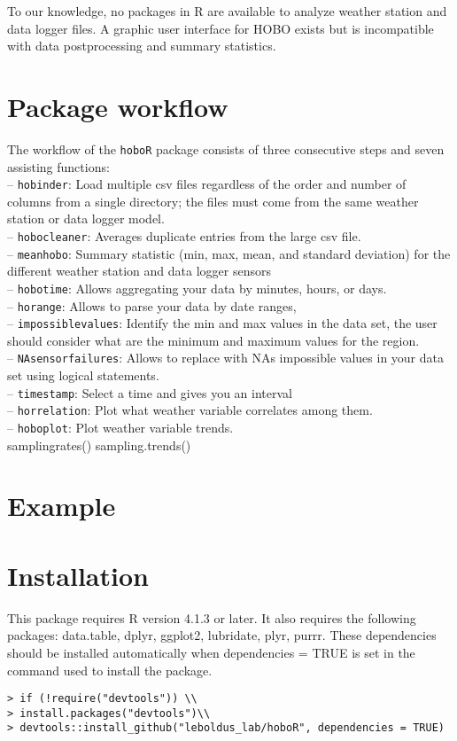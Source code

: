 \documentclass[11pt, oneside]{article}   	%
\begin{document}
To our knowledge, no packages in R are available to analyze weather station and data logger files. A graphic user interface for HOBO exists but is incompatible with data postprocessing and summary statistics. 

\section*{Package workflow}
The workflow of the \verb|hoboR| package consists of three consecutive steps and seven assisting functions: \\
– \verb|hobinder|: Load multiple csv files regardless of the order and number of columns from a single directory; the files must come from the same weather station or data logger model.   \\
–  \verb|hobocleaner|: Averages duplicate entries from the large csv file. \\
–  \verb|meanhobo|: Summary statistic (min, max, mean, and standard deviation) for the different weather station and data logger sensors \\
– \verb|hobotime|: Allows aggregating your data by minutes, hours, or days.\\
– \verb|horange|: Allows to parse your data by date ranges,\\
– \verb|impossiblevalues|: Identify the min and max values in the data set, the user should consider what are the minimum and maximum values for the region. \\
– \verb|NAsensorfailures|: Allows to replace with NAs impossible values in your data set using logical statements. \\
– \verb|timestamp|: Select a time and gives you an interval \\ 
– \verb|horrelation|: Plot what weather variable correlates among them. \\
– \verb|hoboplot|: Plot weather variable trends.\\


samplingrates()
sampling.trends()

\section*{Example}

\section*{Installation}
This package requires R version 4.1.3 or later. It also requires the following packages: data.table, dplyr, ggplot2,  lubridate, plyr, purrr. These dependencies should be installed automatically when dependencies = TRUE is set in the command used to install the package.
\begin{verbatim}
> if (!require("devtools")) \\
> install.packages("devtools")\\
> devtools::install_github("leboldus_lab/hoboR", dependencies = TRUE)
\end{verbatim}
\end{document}
